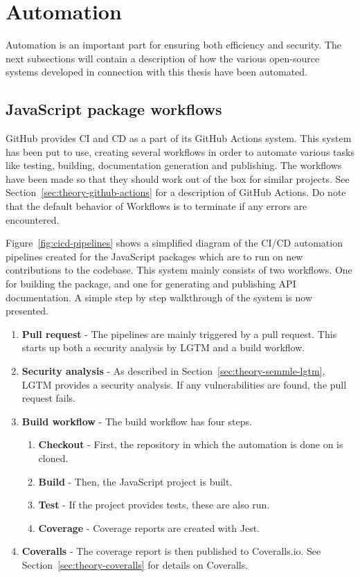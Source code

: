 \section{Automation}
Automation is an important part for ensuring both efficiency and security. The next subsections will contain a description of how the various open-source systems developed in connection with this thesis have been automated.

\subsection{JavaScript package workflows}
\label{sec:method-javascript-package-workflows}
GitHub provides CI and CD as a part of its GitHub Actions system. This system has been put to use, creating several workflows in order to automate various tasks like testing, building, documentation generation and publishing. The workflows have been made so that they should work out of the box for similar projects. See Section~\ref{sec:theory-github-actions} for a description of GitHub Actions. Do note that the default behavior of Workflows is to terminate if any errors are encountered.

Figure~\ref{fig:cicd-pipelines} shows a simplified diagram of the CI/CD automation pipelines created for the JavaScript packages which are to run on new contributions to the codebase. This system mainly consists of two workflows. One for building the package, and one for generating and publishing API documentation. A simple step by step walkthrough of the system is now presented.

\begin{enumerate}
    \item \textbf{Pull request} - The pipelines are mainly triggered by a pull request. This starts up both a security analysis by LGTM and a build workflow.
    \item \textbf{Security analysis} - As described in Section~\ref{sec:theory-semmle-lgtm}, LGTM provides a security analysis. If any vulnerabilities are found, the pull request fails.
    \item \textbf{Build workflow} - The build workflow has four steps.
    \begin{enumerate}
        \item \textbf{Checkout} - First, the repository in which the automation is done on is cloned.
        \item \textbf{Build} - Then, the JavaScript project is built.
        \item \textbf{Test} - If the project provides tests, these are also run.
        \item \textbf{Coverage} - Coverage reports are created with Jest.
    \end{enumerate}
    \item \textbf{Coveralls} - The coverage report is then published to Coveralls.io. See Section~\ref{sec:theory-coveralls} for details on Coveralls.
\end{enumerate}

